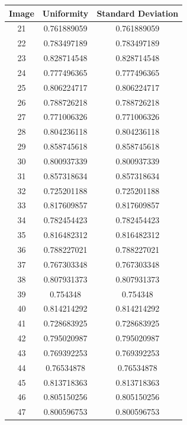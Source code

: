 \documentclass{article}
\begin{document}
\begin{table}[h!]
    \centering
    \begin{tabular}{|c|c|c|}
        \hline
        Image & Uniformity & Standard Deviation \\ \hline
        21 & 0.761889059 & 0.761889059 \\ \hline
        22 & 0.783497189 & 0.783497189 \\ \hline
        23 & 0.828714548 & 0.828714548 \\ \hline
        24 & 0.777496365 & 0.777496365 \\ \hline
        25 & 0.806224717 & 0.806224717 \\ \hline
        26 & 0.788726218 & 0.788726218 \\ \hline
        27 & 0.771006326 & 0.771006326 \\ \hline
        28 & 0.804236118 & 0.804236118 \\ \hline
        29 & 0.858745618 & 0.858745618 \\ \hline
        30 & 0.800937339 & 0.800937339 \\ \hline
        31 & 0.857318634 & 0.857318634 \\ \hline
        32 & 0.725201188 & 0.725201188 \\ \hline
        33 & 0.817609857 & 0.817609857 \\ \hline
        34 & 0.782454423 & 0.782454423 \\ \hline
        35 & 0.816482312 & 0.816482312 \\ \hline
        36 & 0.788227021 & 0.788227021 \\ \hline
        37 & 0.767303348 & 0.767303348 \\ \hline
        38 & 0.807931373 & 0.807931373 \\ \hline
        39 & 0.754348 & 0.754348 \\ \hline
        40 & 0.814214292 & 0.814214292 \\ \hline
        41 & 0.728683925 & 0.728683925 \\ \hline
        42 & 0.795020987 & 0.795020987 \\ \hline
        43 & 0.769392253 & 0.769392253 \\ \hline
        44 & 0.76534878 & 0.76534878 \\ \hline
        45 & 0.813718363 & 0.813718363 \\ \hline
        46 & 0.805150256 & 0.805150256 \\ \hline
        47 & 0.800596753 & 0.800596753 \\ \hline

\end{tabular}
\end{table}
\end{document}
